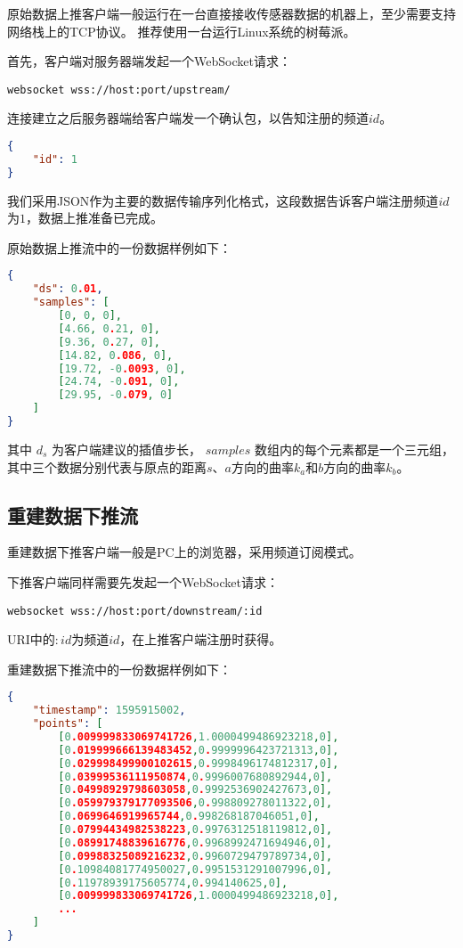 原始数据上推客户端一般运行在一台直接接收传感器数据的机器上，至少需要支持网络栈上的TCP协议。
推荐使用一台运行Linux系统的树莓派。

首先，客户端对服务器端发起一个WebSocket请求：

\begin{lstlisting}
websocket wss://host:port/upstream/
\end{lstlisting}

连接建立之后服务器端给客户端发一个确认包，以告知注册的频道$id$。

\begin{lstlisting}[language=json,firstnumber=1]
{
    "id": 1
}
\end{lstlisting}

我们采用JSON作为主要的数据传输序列化格式，这段数据告诉客户端注册频道$id$为$1$，数据上推准备已完成。

原始数据上推流中的一份数据样例如下：

\begin{lstlisting}[language=json,firstnumber=1]
{
    "ds": 0.01,
    "samples": [
        [0, 0, 0],
        [4.66, 0.21, 0],
        [9.36, 0.27, 0],
        [14.82, 0.086, 0],
        [19.72, -0.0093, 0],
        [24.74, -0.091, 0],
        [29.95, -0.079, 0]
    ]
}
\end{lstlisting}

其中 $d_s$ 为客户端建议的插值步长，
$samples$ 数组内的每个元素都是一个三元组，其中三个数据分别代表与原点的距离$s$、$a$方向的曲率$k_a$和$b$方向的曲率$k_b$。

\subsection{重建数据下推流}

重建数据下推客户端一般是PC上的浏览器，采用频道订阅模式。

下推客户端同样需要先发起一个WebSocket请求：

\begin{lstlisting}
websocket wss://host:port/downstream/:id
\end{lstlisting}

URI中的$:id$为频道$id$，在上推客户端注册时获得。

重建数据下推流中的一份数据样例如下：

\begin{lstlisting}[language=json,firstnumber=1]
{
    "timestamp": 1595915002,
    "points": [
        [0.009999833069741726,1.0000499486923218,0],
        [0.019999666139483452,0.9999996423721313,0],
        [0.029998499900102615,0.9998496174812317,0],
        [0.03999536111950874,0.9996007680892944,0],
        [0.04998929798603058,0.9992536902427673,0],
        [0.059979379177093506,0.998809278011322,0],
        [0.0699646919965744,0.998268187046051,0],
        [0.07994434982538223,0.9976312518119812,0],
        [0.08991748839616776,0.9968992471694946,0],
        [0.09988325089216232,0.9960729479789734,0],
        [0.10984081774950027,0.9951531291007996,0],
        [0.11978939175605774,0.994140625,0],
        [0.009999833069741726,1.0000499486923218,0],
        ...
    ]
}
\end{lstlisting}

